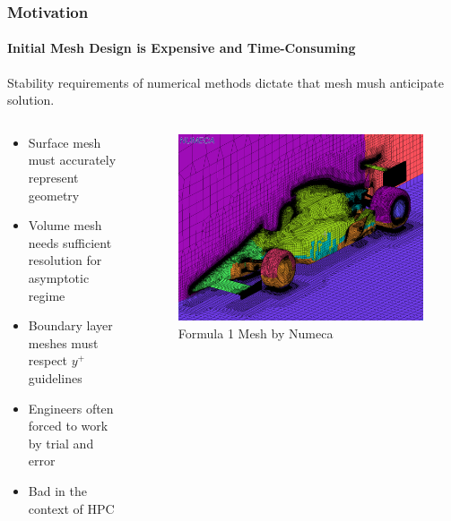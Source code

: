\documentclass[18pt,xcolor=table]{beamer}
\begin{document}
\begin{frame}[t]
\frametitle{Motivation}
\framesubtitle{Initial Mesh Design is Expensive and Time-Consuming}
Stability requirements of numerical methods dictate that mesh mush anticipate solution.
\begin{columns}[t]
\begin{column}[c]{0.4\textwidth}
\begin{itemize}
  \item Surface mesh must accurately represent geometry
  \item Volume mesh needs sufficient resolution for asymptotic regime
  \item Boundary layer meshes must respect $y^+$ guidelines
  \item Engineers often forced to work by trial and error
  \item Bad in the context of HPC
\end{itemize}
\end{column}
\begin{column}[c]{0.6\textwidth}
\vspace{2ex}
\begin{figure}[t]
\centering
\includegraphics[width=1.0\textwidth]{Motivation/NumecaRaceCar.png}
\\\small{Formula 1 Mesh by Numeca}\\
\end{figure}
\end{column}
\end{columns}
\end{frame}
\end{document}
